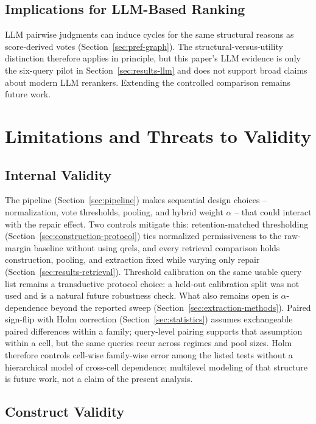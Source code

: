 \documentclass[pdflatex,sn-basic,Numbered]{sn-jnl}
\begin{document}
\subsection{Implications for LLM-Based Ranking}
\label{sec:discussion-llm}

LLM pairwise judgments can induce cycles for the same structural reasons as
score-derived votes (Section~\ref{sec:pref-graph}). The structural-versus-utility
distinction therefore applies in principle, but this paper's LLM evidence is
only the six-query pilot in Section~\ref{sec:results-llm} and does not
support broad claims about modern LLM rerankers. Extending the controlled
comparison remains future work.

\section{Limitations and Threats to Validity}
\label{sec:limitations}

\subsection{Internal Validity}
\label{sec:limitations-internal}

The pipeline (Section~\ref{sec:pipeline}) makes sequential design choices --
normalization, vote thresholds, pooling, and hybrid weight $\alpha$ -- that
could interact with the repair effect. Two controls mitigate this:
retention-matched thresholding (Section~\ref{sec:construction-protocol})
ties normalized permissiveness to the raw-margin baseline without using
qrels, and every retrieval comparison holds construction, pooling, and
extraction fixed while varying only repair
(Section~\ref{sec:results-retrieval}). Threshold calibration on the same
usable query list remains a transductive protocol choice: a held-out
calibration split was not used and is a natural future robustness check.
What also remains open is $\alpha$-dependence beyond the reported sweep
(Section~\ref{sec:extraction-methods}). Paired sign-flip with Holm
correction (Section~\ref{sec:statistics}) assumes exchangeable paired
differences within a family; query-level pairing supports that assumption
within a cell, but the same queries recur across regimes and pool sizes.
Holm therefore controls cell-wise family-wise error among the listed tests
without a hierarchical model of cross-cell dependence; multilevel modeling
of that structure is future work, not a claim of the present analysis.

\subsection{Construct Validity}
\label{sec:limitations-construct}
\end{document}
